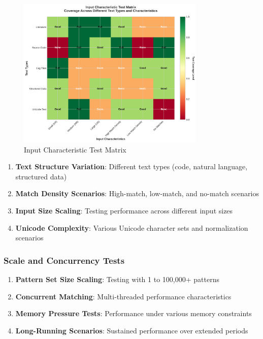 \documentclass[11pt,a4paper]{article}
\begin{document}
\begin{figure}[H]
\centering
\includegraphics[width=0.8\textwidth]{illustrations/input_characteristics.png}
\caption{Input Characteristic Test Matrix}
\label{fig:input_characteristics}
\end{figure}

\begin{enumerate}
    \item \textbf{Text Structure Variation}: Different text types (code, natural language, structured data)
    \item \textbf{Match Density Scenarios}: High-match, low-match, and no-match scenarios
    \item \textbf{Input Size Scaling}: Testing performance across different input sizes
    \item \textbf{Unicode Complexity}: Various Unicode character sets and normalization scenarios
\end{enumerate}

\subsubsection{Scale and Concurrency Tests}

\begin{enumerate}
    \item \textbf{Pattern Set Size Scaling}: Testing with 1 to 100,000+ patterns
    \item \textbf{Concurrent Matching}: Multi-threaded performance characteristics
    \item \textbf{Memory Pressure Tests}: Performance under various memory constraints
    \item \textbf{Long-Running Scenarios}: Sustained performance over extended periods
\end{enumerate}
\end{document}
